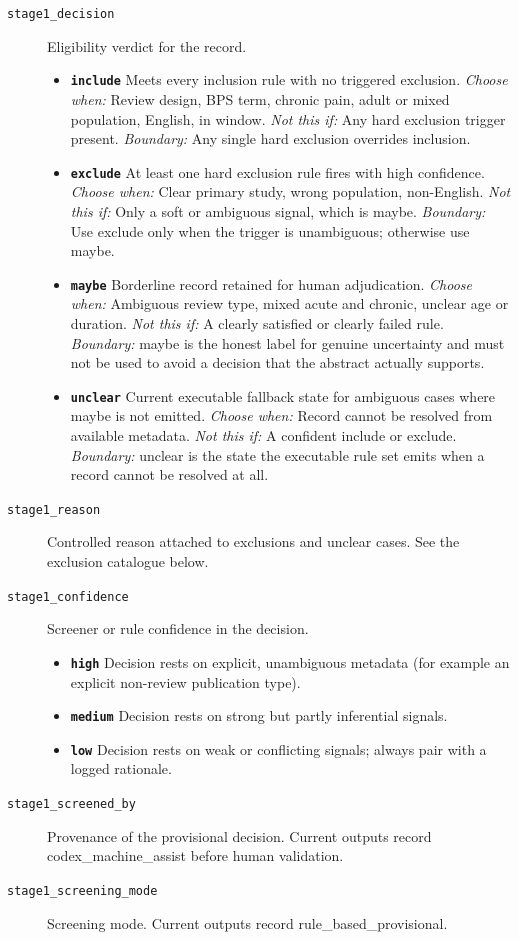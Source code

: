 \documentclass[11pt]{article}
\begin{document}
\begin{description}
\item[\texttt{stage1\_decision}] Eligibility verdict for the record.
  \begin{itemize}[leftmargin=1.3em,itemsep=2pt,topsep=2pt]
  \item \textbf{\texttt{include}} Meets every inclusion rule with no triggered exclusion. {\small \textit{Choose when:} Review design, BPS term, chronic pain, adult or mixed population, English, in window. \textit{Not this if:} Any hard exclusion trigger present. \textit{Boundary:} Any single hard exclusion overrides inclusion.}
  \item \textbf{\texttt{exclude}} At least one hard exclusion rule fires with high confidence. {\small \textit{Choose when:} Clear primary study, wrong population, non-English. \textit{Not this if:} Only a soft or ambiguous signal, which is maybe. \textit{Boundary:} Use exclude only when the trigger is unambiguous; otherwise use maybe.}
  \item \textbf{\texttt{maybe}} Borderline record retained for human adjudication. {\small \textit{Choose when:} Ambiguous review type, mixed acute and chronic, unclear age or duration. \textit{Not this if:} A clearly satisfied or clearly failed rule. \textit{Boundary:} maybe is the honest label for genuine uncertainty and must not be used to avoid a decision that the abstract actually supports.}
  \item \textbf{\texttt{unclear}} Current executable fallback state for ambiguous cases where maybe is not emitted. {\small \textit{Choose when:} Record cannot be resolved from available metadata. \textit{Not this if:} A confident include or exclude. \textit{Boundary:} unclear is the state the executable rule set emits when a record cannot be resolved at all.}
  \end{itemize}
\item[\texttt{stage1\_reason}] Controlled reason attached to exclusions and unclear cases. See the exclusion catalogue below.
\item[\texttt{stage1\_confidence}] Screener or rule confidence in the decision.
  \begin{itemize}[leftmargin=1.3em,itemsep=2pt,topsep=2pt]
  \item \textbf{\texttt{high}} Decision rests on explicit, unambiguous metadata (for example an explicit non-review publication type).
  \item \textbf{\texttt{medium}} Decision rests on strong but partly inferential signals.
  \item \textbf{\texttt{low}} Decision rests on weak or conflicting signals; always pair with a logged rationale.
  \end{itemize}
\item[\texttt{stage1\_screened\_by}] Provenance of the provisional decision. Current outputs record codex\_machine\_assist before human validation.
\item[\texttt{stage1\_screening\_mode}] Screening mode. Current outputs record rule\_based\_provisional.
\end{description}
\end{document}
